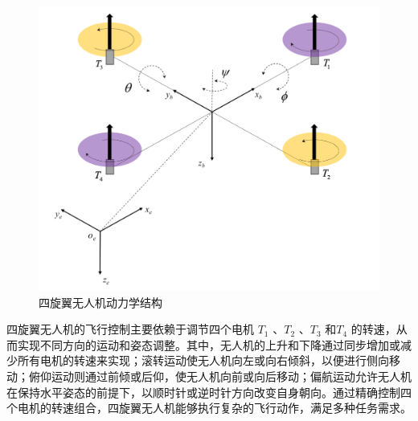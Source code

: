 \documentclass[lang=chs, degree=master, blindreview=false, winfonts=true]{yanputhesis}
\begin{document}
\begin{figure}[hbt!]
	\centering
	\includegraphics[width=28pc]{picture/2_1.png} 
	\caption{四旋翼无人机动力学结构} \label{2_1}
\end{figure}
四旋翼无人机的飞行控制主要依赖于调节四个电机 $T_1$ 、$T_2$ 、$T_3$ 和$T_4$ 的转速，从而实现不同方向的运动和姿态调整。其中，无人机的上升和下降通过同步增加或减少所有电机的转速来实现；滚转运动使无人机向左或向右倾斜，以便进行侧向移动；俯仰运动则通过前倾或后仰，使无人机向前或向后移动；偏航运动允许无人机在保持水平姿态的前提下，以顺时针或逆时针方向改变自身朝向。通过精确控制四个电机的转速组合，四旋翼无人机能够执行复杂的飞行动作，满足多种任务需求。

\end{document}
